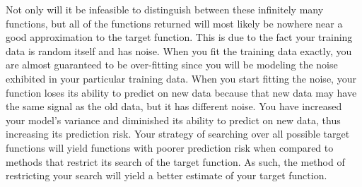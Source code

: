 \documentclass[11pt]{article}
\begin{document}
\vspace{5 mm}
\noindent
Not only will it be infeasible to distinguish between these infinitely many functions, but all of the functions returned will most likely be nowhere near a good approximation to the target function. This is due to the fact your training data is random itself and has noise. When you fit the training data exactly, you are almost guaranteed to be over-fitting since you will be modeling the noise exhibited in your particular training data. When you start fitting the noise, your function loses its ability to predict on new data because that new data may have the same signal as the old data, but it has different noise. You have increased your model's variance and diminished its ability to predict on new data, thus increasing its prediction risk. Your strategy of searching over all possible target functions will yield functions with poorer prediction risk when compared to methods that restrict its search of the target function. As such, the method of restricting your search will yield a better estimate of your target function.
\end{document}
